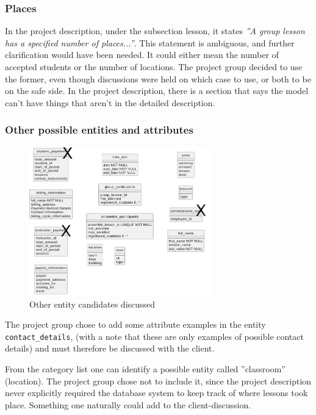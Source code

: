 \documentclass[a4paper]{scrartcl}
\begin{document}
\subsubsection*{Places}
In the project description, under the subsection lesson, it states 
\emph{''A group lesson has a specified number of places...''}. 
This statement is ambiguous,
and further clarification would have been needed. It could either mean the
number of accepted students or the number of locations. The project group
decided to use the former, even though discussions were held on which case to
use,  or both to be on the safe side.  In the project description, there is a
section that says the model can't have things that aren't in the detailed
description.

\subsubsection*{Other possible entities and attributes}
\begin{figure}[h!]
  \begin{center}
    \includegraphics[width=0.7\textwidth]{figures/e_cand.png}
    \caption{Other entity candidates discussed}
    \label{fig:e_cand}
  \end{center}
\end{figure}
The project group chose to add some attribute examples in the entity 
\verb|contact_details|,
(with a note that these
are only examples of possible contact details) and 
must therefore be discussed 
with the client. 

From the category list one can identify a possible entity
called ''classroom'' (location).
The project group chose not to include it, 
since the project description never explicitly required 
the database system to keep track of where lessons took place.
Something one naturally could add to the client-discussion. 
\end{document}
